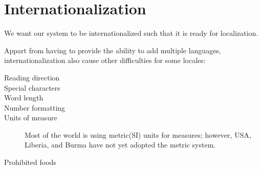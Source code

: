 \section{Internationalization}
We want our system to be internationalized such that it is ready for localization.

Appart from having to provide the ability to add multiple languages, internationalization also cause other difficulties for some locales:

\begin{description}
  \item[Reading direction]
  \item[Special characters]
  \item[Word length]
  \item[Number formatting]
  \item[Units of measure] Most of the world is using metric(SI) units for measures; however, USA, Liberia, and Burma have not yet adopted the metric system.\cite{factbook}
  \item[Prohibited foods]
\end{description}